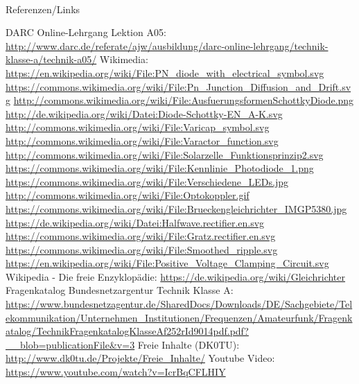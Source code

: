 \renewcommand{\refname}{Referenzen}

\hypertarget{refs}{}
\textcolor{white}{} \\ %
\Large Referenzen/Links
\footnotesize

\begin{thebibliography}{}
      DARC Online-Lehrgang Lektion A05:
                    \url{http://www.darc.de/referate/ajw/ausbildung/darc-online-lehrgang/technik-klasse-a/technik-a05/}
     	Wikimedia:
                    \url{https://en.wikipedia.org/wiki/File:PN_diode_with_electrical_symbol.svg}
                    \url{https://commons.wikimedia.org/wiki/File:Pn_Junction_Diffusion_and_Drift.svg}
                    \url{http://commons.wikimedia.org/wiki/File:AusfuerungsformenSchottkyDiode.png}
                    \url{http://de.wikipedia.org/wiki/Datei:Diode-Schottky-EN_A-K.svg}
                    \url{http://commons.wikimedia.org/wiki/File:Varicap_symbol.svg}
                    \url{http://commons.wikimedia.org/wiki/File:Varactor_function.svg}
                    \url{http://commons.wikimedia.org/wiki/File:Solarzelle_Funktionsprinzip2.svg}
                    \url{https://commons.wikimedia.org/wiki/File:Kennlinie_Photodiode_1.png}
                    \url{https://commons.wikimedia.org/wiki/File:Verschiedene_LEDs.jpg}
                    \url{http://commons.wikimedia.org/wiki/File:Optokoppler.gif}
                    \url{https://commons.wikimedia.org/wiki/File:Brueckengleichrichter_IMGP5380.jpg}
                    \url{https://de.wikipedia.org/wiki/Datei:Halfwave.rectifier.en.svg}
                    \url{https://commons.wikimedia.org/wiki/File:Gratz.rectifier.en.svg}
                    \url{https://commons.wikimedia.org/wiki/File:Smoothed_ripple.svg}
                    \url{https://en.wikipedia.org/wiki/File:Positive_Voltage_Clamping_Circuit.svg}
                    \url{}
                    \url{}
        Wikipedia - Die freie Enzyklopädie:
                    \url{https://de.wikipedia.org/wiki/Gleichrichter}
	   Fragenkatalog Bundesnetzargentur Technik Klasse A:                   
                    \url{https://www.bundesnetzagentur.de/SharedDocs/Downloads/DE/Sachgebiete/Telekommunikation/Unternehmen_Institutionen/Frequenzen/Amateurfunk/Fragenkatalog/TechnikFragenkatalogKlasseAf252rId9014pdf.pdf?__blob=publicationFile&v=3}
        Freie Inhalte (DK0TU):
                    \url{http://www.dk0tu.de/Projekte/Freie_Inhalte/}
         Youtube Video:                   
                    \url{https://www.youtube.com/watch?v=IcrBqCFLHIY}
\end{thebibliography} 


